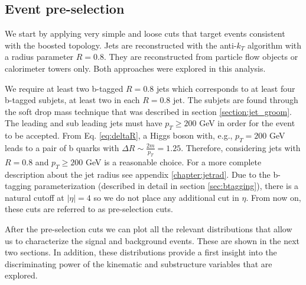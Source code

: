 
\subsection{Event pre-selection}


We start by applying very simple and loose cuts that target events consistent with the boosted topology. Jets are reconstructed with the anti-$k_T$ algorithm with a radius parameter $R=0.8$. They are reconstructed from particle flow objects or calorimeter towers only. Both approaches were explored in this analysis.

We require at least two b-tagged $R=0.8$ jets which corresponds to at least four b-tagged subjets, at least two in each $R=0.8$ jet. The subjets are found through the soft drop mass technique that was described in section \ref{section:jet_groom}. The leading and sub leading jets must have $p_T\geq200$ GeV in order for the event to be accepted. From Eq. \ref{eq:deltaR}, a Higgs boson with, e.g., $p_T=200$ GeV leads to a pair of b quarks with $\Delta R\sim \frac{2m}{p_T}=1.25$. Therefore, considering jets with $R=0.8$ and $p_T\geq 200$ GeV is a reasonable choice. For a more complete description about the jet radius see appendix \ref{chapter:jetrad}. Due to the b-tagging parameterization (described in detail in section \ref{sec:btagging}), there is a natural cutoff at $|\eta|=4$ so we do not place any additional cut in $\eta$. From now on, these cuts are referred to as pre-selection cuts.

After the pre-selection cuts we can plot all the relevant distributions that allow us to characterize the signal and background events. These are shown in the next two sections. In addition, these distributions provide a first insight into the discriminating power of the kinematic and substructure variables that are explored.  

